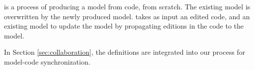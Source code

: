 


	


\begin{definition}%
	 is a process of producing a model from code, from scratch.
	The existing model is overwritten by the newly produced model.
	 takes as
	input an edited code, and an existing model to update the model by propagating
	editions in the code to the model.
\end{definition}

	



In Section \ref{sec:collaboration}, the definitions are integrated into
our process for model-code synchronization. %

